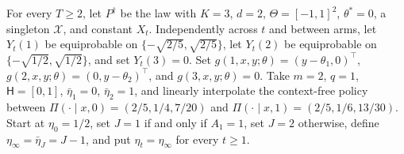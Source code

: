 For every \(T\ge2\), let \(P^{\dagger}\) be the law with \(K=3\), \(d=2\), \(\Theta=[-1,1]^2\), \(\theta^*=0\), a singleton \(\mathcal X\), and constant \(X_t\). Independently across \(t\) and between arms, let \(Y_t(1)\) be equiprobable on \(\{-\sqrt{2/5},\sqrt{2/5}\}\), let \(Y_t(2)\) be equiprobable on \(\{-\sqrt{1/2},\sqrt{1/2}\}\), and set \(Y_t(3)=0\). Set \(g(1,x,y;\theta)=(y-\theta_1,0)^\top\), \(g(2,x,y;\theta)=(0,y-\theta_2)^\top\), and \(g(3,x,y;\theta)=0\). Take \(m=2\), \(q=1\), \(\mathsf H=[0,1]\), \(\bar\eta_1=0\), \(\bar\eta_2=1\), and linearly interpolate the context-free policy between \(\Pi(\cdot\mid x,0)=(2/5,1/4,7/20)\) and \(\Pi(\cdot\mid x,1)=(2/5,1/6,13/30)\). Start at \(\eta_0=1/2\), set \(J=1\) if and only if \(A_1=1\), set \(J=2\) otherwise, define \(\eta_\infty=\bar\eta_J=J-1\), and put \(\eta_t=\eta_\infty\) for every \(t\ge1\).